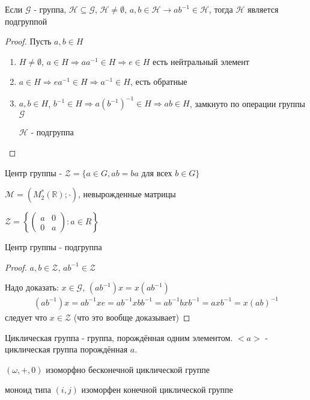 \documentclass[../main/document.tex]{subfiles}
\begin{document}
\begin{thm}
Если $\mathcal{G}$ - группа, $\mathcal{H}\subseteq \mathcal{G}$, $\mathcal{H}\neq \emptyset$, $a,b\in \mathcal{H}\rightarrow ab^{-1}\in \mathcal{H}$, тогда $\mathcal{H}$ является подгруппой
\begin{proof}
Пусть $a,b\in H$
\begin{enumerate}
\item $H\neq \emptyset$, $a\in H\Rightarrow aa^{-1}\in H\Rightarrow e\in H$ есть нейтральный элемент
\item $a\in H\Rightarrow ea^{-1}\in H\Rightarrow a^{-1}\in H$, есть обратные
\item $a,b\in H$, $b^{-1}\in H\Rightarrow a(b^{-1})^{-1}\in H\Rightarrow ab\in H$, замкнуто по операции группы $\mathcal{G}$

$\mathcal{H}$ - подгруппа 
\end{enumerate}
\end{proof}
\end{thm}

\begin{dfn}
Центр группы - $\mathcal{Z}=\{a\in G, ab=ba \text{ для всех } b\in G\}$
\end{dfn}
\begin{exm}
$\mathcal{M}=(M^*_2(\mathbb{R});\cdot)$, невырожденные матрицы

$\mathcal{Z}= \left\{
\begin{pmatrix}a&0\\0&a\end{pmatrix}:a\in R
\right\}$
\end{exm}
\begin{thm}
Центр группы - подгруппа
\begin{proof}
$a,b\in \mathcal{Z}$, $ab^{-1}\in \mathcal{Z}$

Надо доказать: $x\in \mathcal{G}$, $(ab^{-1})x=x(ab^{-1})$
\begin{multline*}
(ab^{-1})x=ab^{-1}xe=ab^{-1}xbb^{-1}=ab^{-1}bxb^{-1}=axb^{-1}=x(ab)^{-1}
\end{multline*}
следует что $x\in \mathcal{Z}$ (что это вообще доказывает)
\end{proof}
\end{thm}

\begin{dfn}
Циклическая группа - группа, порождённая одним элементом. $<a>$ - циклическая группа порождённая $a$.

$(\omega,+,0)$ изоморфно бесконечной циклической группе

моноид типа $(i,j)$ изоморфен конечной циклической группе
\end{dfn}
\end{document}
